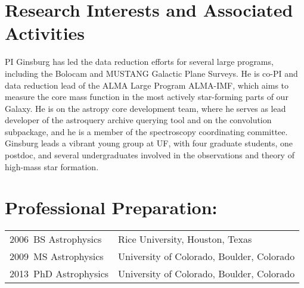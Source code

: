 \documentclass[12pt]{article}
\begin{document}





\section{Research Interests and Associated Activities}
PI Ginsburg has led the data reduction efforts for several large programs, including
the Bolocam and MUSTANG Galactic Plane Surveys.
He is co-PI and data reduction lead of the ALMA Large Program
ALMA-IMF, which aims to measure the core mass function in the most actively star-forming
parts of our Galaxy.
He is on the astropy core development team, where he serves as lead developer of the astroquery
archive querying tool and on the convolution subpackage, and he is a member of the spectroscopy
coordinating committee.
Ginsburg leads a vibrant young group at UF, with four graduate students, one postdoc,
and several undergraduates involved in the observations and theory of high-mass
star formation.

\section{Professional Preparation: }
\begin{tabular} {ll}
    2006~BS Astrophysics & Rice University, Houston, Texas \\
    2009~MS Astrophysics & University of Colorado, Boulder, Colorado \\
    2013~PhD Astrophysics & University of Colorado, Boulder, Colorado \\
\end{tabular}




\setlength{\extrarowheight}{2pt}
\end{document}
